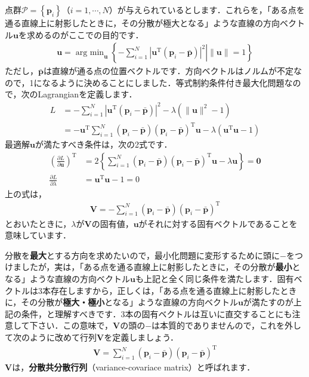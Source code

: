 ﻿\documentclass[a4paper]{jsarticle}
\begin{document}
点群$\mathcal{P}=\left\{\boldsymbol{p}_{i}\right\}$（$i=1,\cdots,N$）が与えられているとします．これらを，「ある点を通る直線上に射影したときに，その分散が極大となる」ような直線の方向ベクトル$\boldsymbol{u}$を求めるのがここでの目的です．
\begin{align*}
\boldsymbol{u}=\mathop{\mathrm{arg~min}}_{\boldsymbol{u}}\left\{
\left.
-\sum_{i=1}^{N}|\boldsymbol{u}^{\mathrm{T}}(\boldsymbol{p}_{i}-\bar{\boldsymbol{p}})|^{2}
\right|
\|\boldsymbol{u}\|=1
\right\}
\end{align*}
ただし，$\bar{\boldsymbol{p}}$は直線が通る点の位置ベクトルです．方向ベクトルはノルムが不定なので，1になるように決めることにしました．等式制約条件付き最大化問題なので，次のLagrangianを定義します．
\begin{align*}
L
&=-\sum_{i=1}^{N}|\boldsymbol{u}^{\mathrm{T}}(\boldsymbol{p}_{i}-\bar{\boldsymbol{p}})|^{2}-\lambda(\|\boldsymbol{u}\|^{2}-1)
\\
&=-\boldsymbol{u}^{\mathrm{T}}\sum_{i=1}^{N}(\boldsymbol{p}_{i}-\bar{\boldsymbol{p}})(\boldsymbol{p}_{i}-\bar{\boldsymbol{p}})^{\mathrm{T}}\boldsymbol{u}
-\lambda(\boldsymbol{u}^{\mathrm{T}}\boldsymbol{u}-1)
\end{align*}
最適解$\boldsymbol{u}$が満たすべき条件は，次の2式です．
\begin{align*}
\left(\frac{\partial L}{\partial\boldsymbol{u}}\right)^{\mathrm{T}}&=
2\left\{\sum_{i=1}^{N}(\boldsymbol{p}_{i}-\bar{\boldsymbol{p}})(\boldsymbol{p}_{i}-\bar{\boldsymbol{p}})^{\mathrm{T}}\boldsymbol{u}-\lambda\boldsymbol{u}\right\}
=\boldsymbol{0}
\\
\frac{\partial L}{\partial\lambda}&=
\boldsymbol{u}^{\mathrm{T}}\boldsymbol{u}-1=0
\end{align*}
上の式は，
\begin{align*}
\boldsymbol{V}=-\sum_{i=1}^{N}(\boldsymbol{p}_{i}-\bar{\boldsymbol{p}})(\boldsymbol{p}_{i}-\bar{\boldsymbol{p}})^{\mathrm{T}}
\end{align*}
とおいたときに，$\lambda$が$\boldsymbol{V}$の固有値，$\boldsymbol{u}$がそれに対する固有ベクトルであることを意味しています．

分散を{\bf 最大}とする方向を求めたいので，最小化問題に変形するために頭に$-$をつけましたが，実は，「ある点を通る直線上に射影したときに，その分散が{\bf 最小}となる」ような直線の方向ベクトル$\boldsymbol{u}$も上記と全く同じ条件を満たします．固有ベクトルは3本存在しますから，正しくは，「ある点を通る直線上に射影したときに，その分散が{\bf 極大・極小}となる」ような直線の方向ベクトル$\boldsymbol{u}$が満たすのが上記の条件，と理解すべきです．3本の固有ベクトルは互いに直交することにも注意して下さい．この意味で，$\boldsymbol{V}$の頭の$-$は本質的でありませんので，これを外して次のように改めて行列$\boldsymbol{V}$を定義しましょう．
\begin{align*}
\boldsymbol{V}=\sum_{i=1}^{N}(\boldsymbol{p}_{i}-\bar{\boldsymbol{p}})(\boldsymbol{p}_{i}-\bar{\boldsymbol{p}})^{\mathrm{T}}
\end{align*}
$\boldsymbol{V}$は，{\bf 分散共分散行列}（variance-covariace matrix）と呼ばれます．
\end{document}
